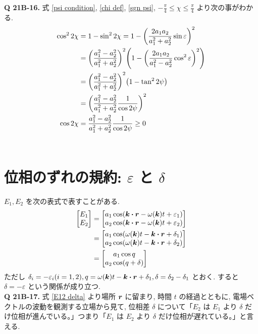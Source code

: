 \documentclass[uplatex,a4paper,dvipdfmx]{jsarticle}
\theoremstyle{definition}
\begin{document}
\textbf{Q 21B-16.}
式 \eqref{psi condition}, \eqref{chi def}, \eqref{sgn psi}, $-\frac{\pi}{4} \leq \chi \leq \frac{\pi}{4}$ より次の事がわかる.
\begin{align}
  \cos^22\chi & = 1 - \sin^22\chi = 1 - \qty(\frac{2a_1a_2}{a_1^2 + a_2^2}\sin\varepsilon)^2                                  \\
              & = \qty(\frac{a_1^2 - a_2^2}{a_1^2 + a_2^2})^2\qty(1 - \qty(\frac{2a_1a_2}{a_1^2 - a_2^2}\cos^2\varepsilon)^2) \\
              & = \qty(\frac{a_1^2 - a_2^2}{a_1^2 + a_2^2})^2\qty(1 - \tan^22\psi)                                            \\
              & = \qty(\frac{a_1^2 - a_2^2}{a_1^2 + a_2^2}\frac{1}{\cos2\psi})^2                                              \\
  \cos2\chi   & = \frac{a_1^2 - a_2^2}{a_1^2 + a_2^2}\frac{1}{\cos2\psi} \geq 0 \label{cos 2chi}
\end{align} \\

\section{位相のずれの規約: $\varepsilon$ と $\delta$}
$E_1, E_2$ を次の表式で表すことがある.
\begin{align}
  \mqty[E_1                                                 \\ E_2] &= \mqty[a_1\cos(\kk\vdot\rr - \omega(\kk)t + \varepsilon_1) \\ a_2\cos(\kk\vdot\rr - \omega(\kk)t + \varepsilon_2)] \\
   & = \mqty[a_1\cos(\omega(\kk)t - \kk\vdot\rr + \delta_1) \\ a_2\cos(\omega(\kk)t - \kk\vdot\rr + \delta_2)] \\
   & = \mqty[a_1\cos q                                      \\ a_2\cos(q + \delta)] \label{E12 delta}
\end{align}
ただし $\delta_i = - \varepsilon_i (i = 1, 2), q = \omega(\kk)t - \kk\vdot\rr + \delta_1, \delta = \delta_2 - \delta_1$ とおく. すると $\delta = -\varepsilon$ という関係が成り立つ. \\

\textbf{Q 21B-17.}
式 \eqref{E12 delta} より場所 $\vb*{r}$ に留まり, 時間 $t$ の経過とともに, 電場ベクトルの波動を観測する立場から見て, 位相差 $\delta$ について「$E_2$ は $E_1$ より $\delta$ だけ位相が進んでいる。」つまり「$E_1$ は $E_2$ より $\delta$ だけ位相が遅れている。」と言える.
\end{document}
